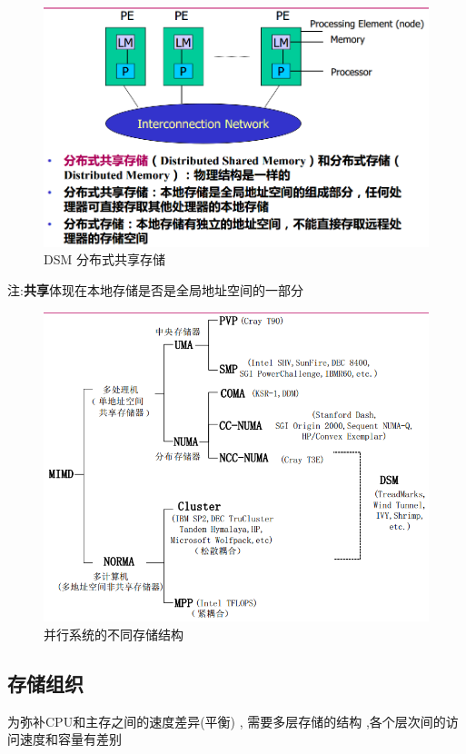 \documentclass[UTF8,a4paper]{ctexart}
\begin{document}
  \begin{figure}[H]
    \centering
    \includegraphics[scale = 0.3]{assets/ParallelComputing_c0e2d.png}
    \caption{DSM 分布式共享存储}
  \end{figure}
  注:\textbf{共享}体现在本地存储是否是全局地址空间的一部分

  \begin{figure}[H]
    \centering
    \includegraphics[scale = 0.3]{assets/ParallelComputing_f368c.png}
    \caption{并行系统的不同存储结构}
  \end{figure}

  \subsection{存储组织}
  为弥补CPU和主存之间的速度差异(平衡) , 需要多层存储的结构 ,各个层次间的访问速度和容量有差别
\end{document}
